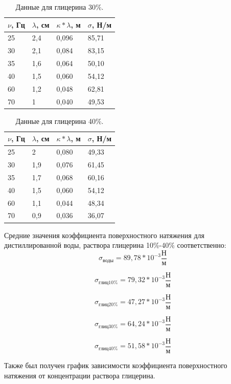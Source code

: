 \documentclass[a4paper,14pt]{article}
\begin{document}
\clearpage

\begin{table}[!ht]
    \centering
    \begin{tabular}{|l|l|l|l|}
    \hline
        $\nu$, Гц & $\lambda$, см & $\kappa*\lambda$, м & $\sigma$, Н/м \\ \hline
        25 & 2,4 & 0,096 & 85,71 \\ \hline
        30 & 2,1 & 0,084 & 83,15 \\ \hline
        35 & 1,6 & 0,064 & 50,10 \\ \hline
        40 & 1,5 & 0,060 & 54,12 \\ \hline
        60 & 1,2 & 0,048 & 62,81 \\ \hline
        70 & 1 & 0,040 & 49,53 \\ \hline
    \end{tabular}
    \caption{Данные для глицерина 30\%.}
\end{table}

\begin{table}[!ht]
    \centering
    \begin{tabular}{|l|l|l|l|}
    \hline
        $\nu$, Гц & $\lambda$, см & $\kappa*\lambda$, м & $\sigma$, Н/м \\ \hline
        25 & 2 & 0,080 & 49,33 \\ \hline
        30 & 1,9 & 0,076 & 61,45 \\ \hline
        35 & 1,7 & 0,068 & 60,16 \\ \hline
        40 & 1,5 & 0,060 & 54,12 \\ \hline
        60 & 1,1 & 0,044 & 48,34 \\ \hline
        70 & 0,9 & 0,036 & 36,07 \\ \hline
    \end{tabular}
    \caption{Данные для глицерина 40\%.}
\end{table}
Средние значения коэффициента поверхностного натяжения для дистиллированной воды, раствора глицерина 10\%-40\% соответственно: 
$$
\sigma_{воды} = 89,78*10^{-3} \frac{Н}{м}
$$

$$
\sigma_{глиц10\%} = 79,32*10^{-3} \frac{Н}{м}
$$

$$
\sigma_{глиц20\%} = 47,27*10^{-3} \frac{Н}{м}
$$

$$
\sigma_{глиц30\%} = 64,24*10^{-3} \frac{Н}{м}
$$

$$
\sigma_{глиц40\%} = 51,58*10^{-3} \frac{Н}{м}
$$

\clearpage

Также был получен график зависимости коэффициента поверхностного натяжения от концентрации раствора глицерина.
\end{document}
